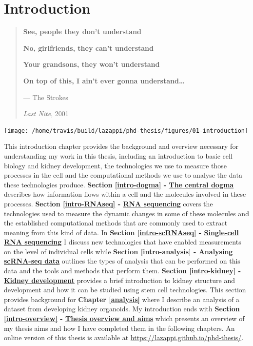 \documentclass[11pt,a4paper,titlepage,twoside,openright]{style/unimelbthesis}
\theoremstyle{definition}
\theoremstyle{definition}
\theoremstyle{definition}
\theoremstyle{remark}
\begin{document}
\begin{mainmatter}

\mainmatterheadings

\hypertarget{introduction}{%
\chapter{Introduction}\label{introduction}}

\begin{quote}
\textbf{See, people they don't understand}

\textbf{No, girlfriends, they can't understand}

\textbf{Your grandsons, they won't understand}

\textbf{On top of this, I ain't ever gonna understand\ldots{}}

--- The Strokes

\emph{Last Nite}, 2001
\end{quote}

\begin{center}\texttt{[image: /home/travis/build/lazappi/phd-thesis/figures/01-introduction]} \end{center}

\clearpage

This introduction chapter provides the background and overview necessary for understanding my work in this thesis, including an introduction to basic cell biology and kidney development, the technologies we use to measure those processes in the cell and the computational methods we use to analyse the data these technologies produce. \textbf{Section \ref{intro-dogma} - \protect\hyperlink{intro-dogma}{The central dogma}} describes how information flows within a cell and the molecules involved in these processes. \textbf{Section \ref{intro-RNAseq} - \protect\hyperlink{intro-RNAseq}{RNA sequencing}} covers the technologies used to measure the dynamic changes in some of these molecules and the established computational methods that are commonly used to extract meaning from this kind of data. In \textbf{Section \ref{intro-scRNAseq} - \protect\hyperlink{intro-scRNAseq}{Single-cell RNA sequencing}} I discuss new technologies that have enabled measurements on the level of individual cells while \textbf{Section \ref{intro-analysis} - \protect\hyperlink{intro-analysis}{Analysing scRNA-seq data}} outlines the types of analysis that can be performed on this data and the tools and methods that perform them. \textbf{Section \ref{intro-kidney} - \protect\hyperlink{intro-kidney}{Kidney development}} provides a brief introduction to kidney structure and development and how it can be studied using stem cell technologies. This section provides background for \textbf{Chapter \ref{analysis}} where I describe an analysis of a dataset from developing kidney organoids. My introduction ends with \textbf{Section \ref{intro-overview} - \protect\hyperlink{intro-overview}{Thesis overview and aims}} which presents an overview of my thesis aims and how I have completed them in the following chapters. An online version of this thesis is available at \url{https://lazappi.github.io/phd-thesis/}.


\end{mainmatter}
\end{document}
